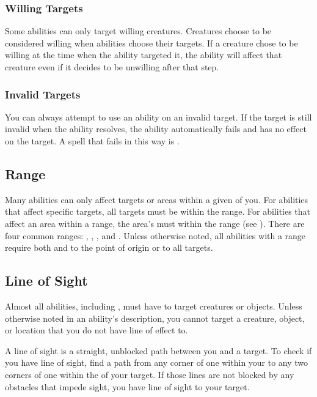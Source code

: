         \subsubsection{Willing Targets}
            Some abilities can only target willing creatures.
            Creatures choose to be considered willing when abilities choose their targets.
            If a creature chose to be willing at the time when the ability targeted it, the ability will affect that creature even if it decides to be unwilling after that step.

        \subsubsection{Invalid Targets}
            You can always attempt to use an ability on an invalid target.
            If the target is still invalid when the ability resolves, the ability automatically fails and has no effect on the target.
            A spell that fails in this way is .

    \subsection{Range}\label{Range}
        Many abilities can only affect targets or areas within a given  of you.
        For abilities that affect specific targets, all targets must be within the range.
        For abilities that affect an area within a range, the area's  must within the range (see ).
        There are four common ranges: \rngclose, \rngmed, \rnglong, and \rngext.
        Unless otherwise noted, all abilities with a range require both  and  to the point of origin or to all targets.

    \subsection{Line of Sight}\label{Line of Sight}
        Almost all abilities, including , must have  to target creatures or objects.
        Unless otherwise noted in an ability's description, you cannot target a creature, object, or location that you do not have line of effect to.

        A line of sight is a straight, unblocked path between you and a target.
        To check if you have line of sight, find a path from any corner of one  within your  to any two corners of one  within the  of your target.
        If those lines are not blocked by any obstacles that impede sight, you have line of sight to your target.

